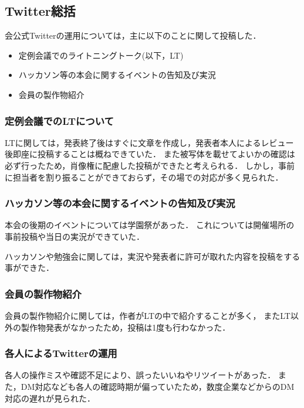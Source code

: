 \subsection*{Twitter総括}


会公式Twitterの運用については，主に以下のことに関して投稿した．
\begin{itemize}
\item 定例会議でのライトニングトーク(以下，LT)
\item ハッカソン等の本会に関するイベントの告知及び実況
\item 会員の製作物紹介
\end{itemize}

\subsubsection*{定例会議でのLTについて}
LTに関しては，発表終了後はすぐに文章を作成し，発表者本人によるレビュー後即座に投稿することは概ねできていた．
また被写体を載せてよいかの確認は必ず行ったため，肖像権に配慮した投稿ができたと考えられる．
しかし，事前に担当者を割り振ることができておらず，その場での対応が多く見られた．

\subsubsection*{ハッカソン等の本会に関するイベントの告知及び実況}
本会の後期のイベントについては学園祭があった．
これについては開催場所の事前投稿や当日の実況ができていた．

ハッカソンや勉強会に関しては，実況や発表者に許可が取れた内容を投稿をする事ができた．

\subsubsection*{会員の製作物紹介}
会員の製作物紹介に関しては，作者がLTの中で紹介することが多く，
またLT以外の製作物発表がなかったため，投稿は1度も行わなかった．

\subsubsection*{各人によるTwitterの運用}
各人の操作ミスや確認不足により、誤ったいいねやリツイートがあった．
また，DM対応なども各人の確認時期が偏っていたため，数度企業などからのDM対応の遅れが見られた．
